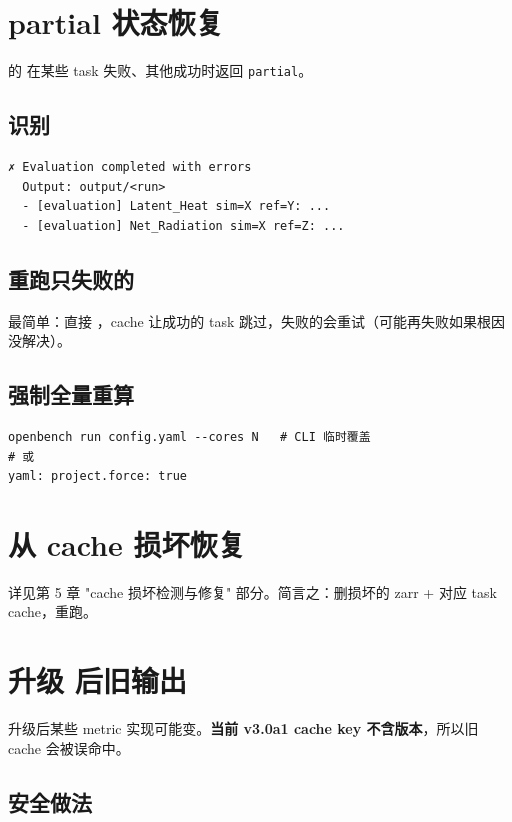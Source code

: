 \section{partial 状态恢复}

\openbench{} 的  在某些 task 失败、其他成功时返回 \texttt{partial}。

\subsection{识别}

\begin{verbatim}
✗ Evaluation completed with errors
  Output: output/<run>
  - [evaluation] Latent_Heat sim=X ref=Y: ...
  - [evaluation] Net_Radiation sim=X ref=Z: ...
\end{verbatim}

\subsection{重跑只失败的}

最简单：直接 ，cache 让成功的 task 跳过，失败的会重试（可能再失败如果根因没解决）。

\subsection{强制全量重算}

\begin{verbatim}
openbench run config.yaml --cores N   # CLI 临时覆盖
# 或
yaml: project.force: true
\end{verbatim}

\section{从 cache 损坏恢复}

详见第 5 章 "cache 损坏检测与修复" 部分。简言之：删损坏的 zarr + 对应 task cache，重跑。

\section{升级 \openbench{} 后旧输出}

升级后某些 metric 实现可能变。\textbf{当前 v3.0a1 cache key 不含版本}，所以旧 cache 会被误命中。

\subsection{安全做法}

